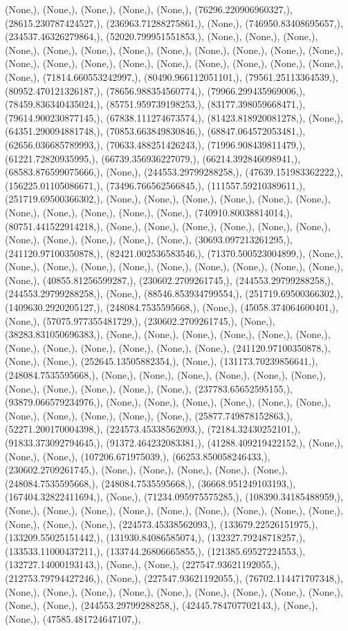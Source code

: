 \documentclass{article}
\begin{document}
(None,), (None,), (None,), (None,), (None,), (76296.220906960327,), (28615.230787424527,), (236963.71288275861,), (None,), (746950.83408695657,), (234537.46326279864,), (52020.799951551853,), (None,), (None,), (None,), (None,), (None,), (None,), (None,), (None,), (None,), (None,), (None,), (None,), (None,), (None,), (None,), (None,), (None,), (None,), (None,), (None,), (None,), (None,), (71814.660553242997,), (80490.966112051101,), (79561.25113364539,), (80952.470121326187,), (78656.988354560774,), (79966.299435969006,), (78459.836340435024,), (85751.959739198253,), (83177.398059668471,), (79614.900230877145,), (67838.111274673574,), (81423.818920081278,), (None,), (64351.290094881748,), (70853.663849830846,), (68847.064572053481,), (62656.036685789993,), (70633.488251426243,), (71996.908439811479,), (61221.72820935995,), (66739.356936227079,), (66214.392846098941,), (68583.876599075666,), (None,), (244553.29799288258,), (47639.151983362222,), (156225.01105086671,), (73496.766562566845,), (111557.59210389611,), (251719.69500366302,), (None,), (None,), (None,), (None,), (None,), (None,), (None,), (None,), (None,), (None,), (None,), (740910.80038814014,), (80751.441522914218,), (None,), (None,), (None,), (None,), (None,), (None,), (None,), (None,), (None,), (None,), (None,), (30693.097213261295,), (241120.97100350878,), (82421.002536583546,), (71370.500523004899,), (None,), (None,), (None,), (None,), (None,), (None,), (None,), (None,), (None,), (None,), (None,), (40855.81256599287,), (230602.2709261745,), (244553.29799288258,), (244553.29799288258,), (None,), (88546.853934799554,), (251719.69500366302,), (1409630.2920205127,), (248084.7535595668,), (None,), (45058.374064600401,), (None,), (57075.977355481729,), (230602.2709261745,), (None,), (38283.831050696383,), (None,), (None,), (None,), (None,), (None,), (None,), (None,), (None,), (None,), (None,), (None,), (None,), (241120.97100350878,), (None,), (None,), (252645.13505882354,), (None,), (131173.70239856641,), (248084.7535595668,), (None,), (None,), (None,), (None,), (None,), (None,), (None,), (None,), (None,), (None,), (None,), (237783.65652595155,), (93879.066579234976,), (None,), (None,), (None,), (None,), (None,), (None,), (None,), (None,), (None,), (None,), (None,), (25877.749878152863,), (52271.200170004398,), (224573.45338562093,), (72184.32430252101,), (91833.373092794645,), (91372.464232083381,), (41288.409219422152,), (None,), (None,), (None,), (107206.671975039,), (66253.850058246433,), (230602.2709261745,), (None,), (None,), (None,), (None,), (None,), (248084.7535595668,), (248084.7535595668,), (36668.951249103193,), (167404.32822411694,), (None,), (71234.095975575285,), (108390.34185488959,), (None,), (None,), (None,), (None,), (None,), (None,), (None,), (None,), (None,), (None,), (None,), (None,), (224573.45338562093,), (133679.22526151975,), (133209.55025151442,), (131930.84086585074,), (132327.79248718257,), (133533.11000437211,), (133744.26806665855,), (121385.69527224553,), (132727.14000193143,), (None,), (None,), (227547.93621192055,), (212753.79794427246,), (None,), (227547.93621192055,), (76702.114471707348,), (None,), (None,), (None,), (None,), (None,), (None,), (None,), (None,), (None,), (None,), (None,), (244553.29799288258,), (42445.784707702143,), (None,), (None,), (47585.481724647107,), 
\end{document}
